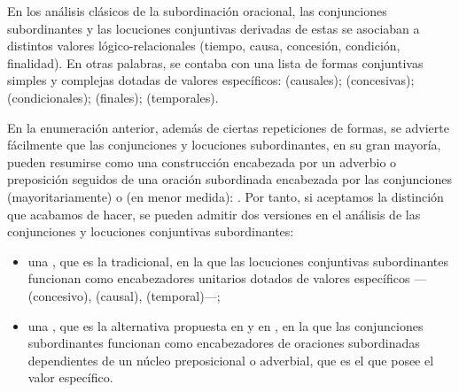 En los análisis clásicos de la subordinación oracional, las conjunciones
subordinantes y las locuciones conjuntivas derivadas de estas se asociaban a
distintos valores lógico-relacionales (tiempo, causa, concesión, condición,
finalidad). En otras palabras, se contaba con una lista de formas conjuntivas
simples y complejas dotadas de valores específicos:  (causales);  (concesivas); 
(condicionales);  (finales);  (temporales).

En la enumeración anterior, además de ciertas repeticiones de formas, se advierte
fácilmente que las conjunciones y locuciones subordinantes, en su gran mayoría,
pueden resumirse como una construcción encabezada por un adverbio o preposición
seguidos de una oración subordinada encabezada por las conjunciones 
(mayoritariamente) o  (en menor medida): . Por
tanto, si aceptamos la distinción que acabamos de hacer, se pueden admitir dos
versiones en el análisis de las conjunciones y locuciones conjuntivas
subordinantes:

\begin{itemize}
  \item una , que es la tradicional, en la que las
        locuciones conjuntivas subordinantes funcionan como encabezadores
        unitarios dotados de valores específicos --- (concesivo),
         (causal),  (temporal)---;
  \item una , que es la alternativa propuesta en
        \textcite{bosque2009} y en \textcite{brucart2009,brucart2016}, en la que
        las conjunciones subordinantes funcionan como encabezadores de oraciones
        subordinadas dependientes de un núcleo preposicional o adverbial, que es
        el que posee el valor específico.
\end{itemize}

